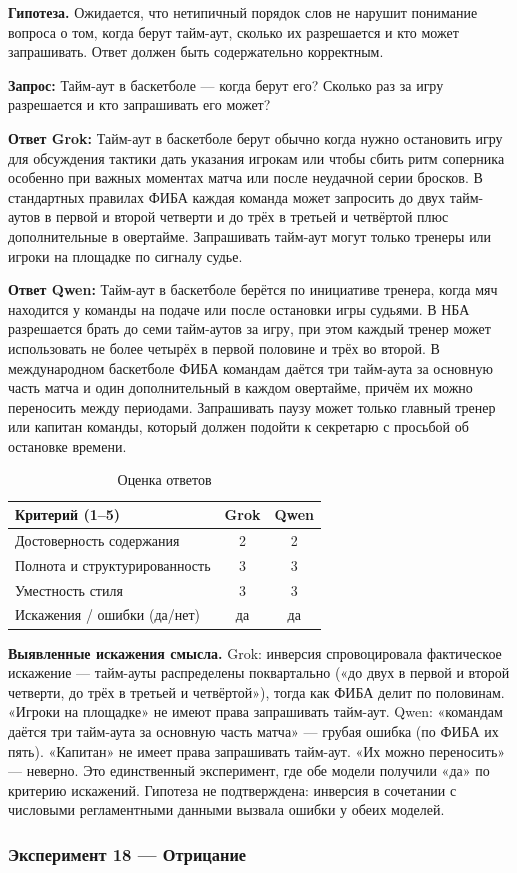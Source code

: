 \documentclass[a4paper, final]{article}
\newcommand{\scoretablefilled}[8]{%
    \vspace{4pt}
    \begin{table}[h!]
    \centering
    \small
    \begin{tabular}{|l|c|c|}
    \hline
    \textbf{Критерий (1--5)} & \textbf{Grok} & \textbf{Qwen} \\
    \hline
    Достоверность содержания & #1 & #2 \\
    \hline
    Полнота и структурированность & #3 & #4 \\
    \hline
    Уместность стиля & #5 & #6 \\
    \hline
    Искажения / ошибки (да/нет) & #7 & #8 \\
    \hline
    \end{tabular}
    \caption{Оценка ответов}
    \end{table}
    \vspace{2pt}
}
\begin{document}
\noindent\textbf{Гипотеза.} Ожидается, что нетипичный порядок слов не нарушит понимание вопроса о том, когда берут тайм-аут, сколько их разрешается и кто может запрашивать. Ответ должен быть содержательно корректным.

\noindent\textbf{Запрос:} Тайм-аут в баскетболе — когда берут его? Сколько раз за игру разрешается и кто запрашивать его может?

\noindent\textbf{Ответ Grok:} Тайм-аут в баскетболе берут обычно когда нужно остановить игру для обсуждения тактики дать указания игрокам или чтобы сбить ритм соперника особенно при важных моментах матча или после неудачной серии бросков. В стандартных правилах ФИБА каждая команда может запросить до двух тайм-аутов в первой и второй четверти и до трёх в третьей и четвёртой плюс дополнительные в овертайме. Запрашивать тайм-аут могут только тренеры или игроки на площадке по сигналу судье.

\noindent\textbf{Ответ Qwen:} Тайм-аут в баскетболе берётся по инициативе тренера, когда мяч находится у команды на подаче или после остановки игры судьями. В НБА разрешается брать до семи тайм-аутов за игру, при этом каждый тренер может использовать не более четырёх в первой половине и трёх во второй. В международном баскетболе ФИБА командам даётся три тайм-аута за основную часть матча и один дополнительный в каждом овертайме, причём их можно переносить между периодами. Запрашивать паузу может только главный тренер или капитан команды, который должен подойти к секретарю с просьбой об остановке времени.

\scoretablefilled{2}{2}{3}{3}{3}{3}{да}{да}

\noindent\textbf{Выявленные искажения смысла.} Grok: инверсия спровоцировала фактическое искажение — тайм-ауты распределены поквартально («до двух в первой и второй четверти, до трёх в третьей и четвёртой»), тогда как ФИБА делит по половинам. «Игроки на площадке» не имеют права запрашивать тайм-аут. Qwen: «командам даётся три тайм-аута за основную часть матча» — грубая ошибка (по ФИБА их пять). «Капитан» не имеет права запрашивать тайм-аут. «Их можно переносить» — неверно. Это единственный эксперимент, где обе модели получили «да» по критерию искажений. Гипотеза не подтверждена: инверсия в сочетании с числовыми регламентными данными вызвала ошибки у обеих моделей.

\newpage

\subsubsection{Эксперимент 18 — Отрицание}
\end{document}
